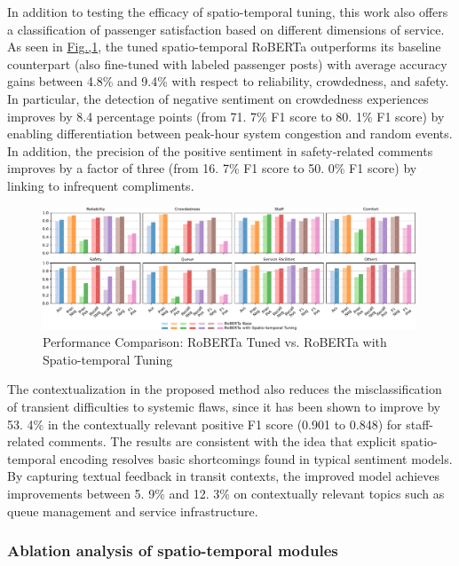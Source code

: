 \documentclass[a4paper,fleqn,12pt]{cas-sc}
\begin{document}
In addition to testing the efficacy of spatio-temporal tuning, this work also offers a classification of passenger satisfaction based on different dimensions of service. As seen in \hyperref[fig:roberta_comparison]{Fig.,\ref{fig:roberta_comparison}}, the tuned spatio-temporal RoBERTa outperforms its baseline counterpart (also fine-tuned with labeled passenger posts) with average accuracy gains between 4.8\% and 9.4\% with respect to reliability, crowdedness, and safety. In particular, the detection of negative sentiment on crowdedness experiences improves by 8.4 percentage points (from 71. 7\% F1 score to 80. 1\% F1 score) by enabling differentiation between peak-hour system congestion and random events. In addition, the precision of the positive sentiment in safety-related comments improves by a factor of three (from 16. 7\% F1 score to 50. 0\% F1 score) by linking to infrequent compliments.

\begin{figure}[htbp]
\centering
\includegraphics[width=0.99\textwidth]{figs/roberta_comparison_h.pdf}
\caption{Performance Comparison: RoBERTa Tuned vs. RoBERTa with Spatio-temporal Tuning}\label{fig:roberta_comparison}
\end{figure}

The contextualization in the proposed method also reduces the misclassification of transient difficulties to systemic flaws, since it has been shown to improve by 53. 4\% in the contextually relevant positive F1 score (0.901 to 0.848) for staff-related comments. The results are consistent with the idea that explicit spatio-temporal encoding resolves basic shortcomings found in typical sentiment models. By capturing textual feedback in transit contexts, the improved model achieves improvements between 5. 9\% and 12. 3\% on contextually relevant topics such as queue management and service infrastructure.

\subsubsection{Ablation analysis of spatio-temporal modules}
\end{document}
